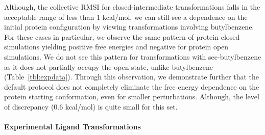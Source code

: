 Although, the collective RMSI for closed-intermediate transformations falls in the acceptable range of less than 1 kcal/mol, we can still see a dependence on the initial protein configuration by viewing transformations involving butylbenzene.
For these cases in particular, we observe the same pattern of protein closed simulations yielding positive free energies and negative for protein open simulations.
We do not see this pattern for transformations with sec-butylbenzene as it does not partially occupy the open state, unlike butylbenzene (Table~\ref{tbl:expdata}).
Through this observation, we demonstrate further that the default protocol does not completely eliminate the free energy dependence on the protein starting conformation, even for smaller perturbations.
Although, the level of discrepancy (0.6 kcal/mol) is quite small for this set.

\paragraph{Experimental Ligand Transformations}

